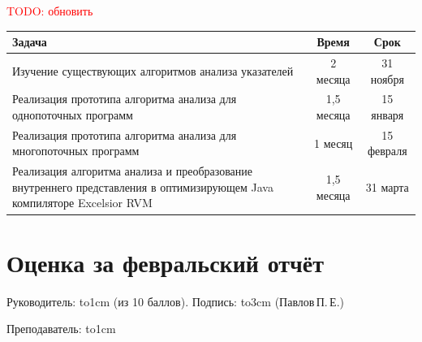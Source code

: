 \documentclass[14pt,titlepage]{extarticle}
\newcommand{\todo}[1]{\textcolor{red}{TODO: #1}}
\newcommand{\underscore}[1]{\hbox to#1{\hrulefill}}
\begin{document}
    \todo{обновить}
    \begin{center}
      \begin{tabular}{|p{10.5cm}|c|c|}\hline
        \textbf{Задача}                       &\textbf{Время} & \textbf{Срок}\\
        \hline
        Изучение существующих алгоритмов анализа указателей
                                              & 2 месяца    & 31 ноября \\
        \hline
        Реализация прототипа алгоритма анализа для однопоточных программ
                                              & 1,5 месяца  & 15 января \\
        \hline
        Реализация прототипа алгоритма анализа для многопоточных программ
                                              & 1 месяц     & 15 февраля \\
        \hline
        Реализация алгоритма анализа и преобразование внутреннего представления
        в оптимизирующем Java компиляторе Excelsior RVM
                                              & 1,5 месяца  & 31 марта \\
        \hline
      \end{tabular}
    \end{center}



  \newpage
  \thispagestyle{empty}
  \pagestyle{empty}
  \section*{Оценка за февральский отчёт}

    Руководитель: \underscore{1cm} (из 10 баллов).
    Подпись: \underscore{3cm} (Павлов\,П.\,Е.)

    \vspace{0.5cm}
    Преподаватель: \underscore{1cm}
\end{document}

